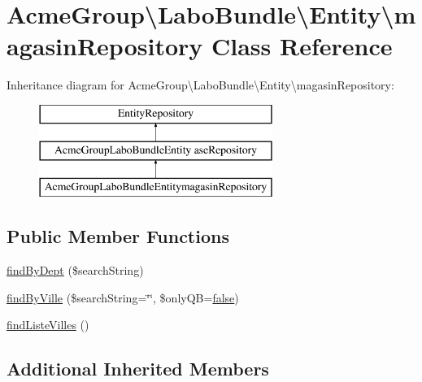 \hypertarget{class_acme_group_1_1_labo_bundle_1_1_entity_1_1magasin_repository}{\section{Acme\+Group\textbackslash{}Labo\+Bundle\textbackslash{}Entity\textbackslash{}magasin\+Repository Class Reference}
\label{class_acme_group_1_1_labo_bundle_1_1_entity_1_1magasin_repository}
}
Inheritance diagram for Acme\+Group\textbackslash{}Labo\+Bundle\textbackslash{}Entity\textbackslash{}magasin\+Repository\+:\begin{figure}[H]
\begin{center}
\leavevmode
\includegraphics[height=3.000000cm]{class_acme_group_1_1_labo_bundle_1_1_entity_1_1magasin_repository}
\end{center}
\end{figure}
\subsection*{Public Member Functions}
\begin{DoxyCompactItemize}
\item 
\hyperlink{class_acme_group_1_1_labo_bundle_1_1_entity_1_1magasin_repository_a9250341cc211438421b5c47dcebd1662}{find\+By\+Dept} (\$search\+String)
\item 
\hyperlink{class_acme_group_1_1_labo_bundle_1_1_entity_1_1magasin_repository_ac59829b632a9e5ff0722a4b952c47f1f}{find\+By\+Ville} (\$search\+String=\char`\"{}\char`\"{}, \$only\+Q\+B=\hyperlink{validate_8js_a5df37b7f02e5cdc7d9412b7f872b8e01}{false})
\item 
\hyperlink{class_acme_group_1_1_labo_bundle_1_1_entity_1_1magasin_repository_abef7754a9b474c272b5e88a08c2636f4}{find\+Liste\+Villes} ()
\end{DoxyCompactItemize}
\subsection*{Additional Inherited Members}


